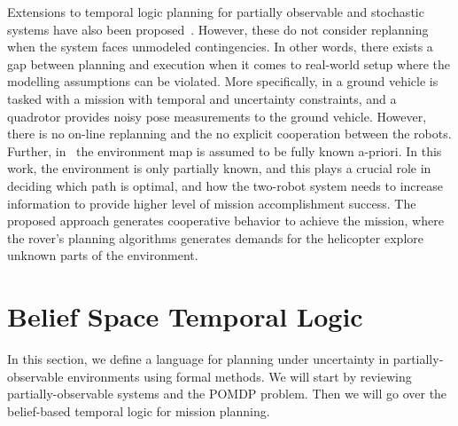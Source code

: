 \documentclass[letterpaper]{article} %
\newcommand{\cristi}[1]{{\color{orange} [Cristi] #1}}
\begin{document}
	
	
	
	
	Extensions to temporal logic planning for partially observable and stochastic systems have also been
	proposed~\cite{Cristi-CDC-2016,dorsa-rss2016,fu2015integrating}.
	However, these do not consider replanning when the system faces unmodeled contingencies.
	In other words, there exists a gap between planning and execution when it comes to real-world setup
	where the modelling assumptions can be violated.
	More specifically, in \cite{Cristi-CDC-2016} a ground vehicle is tasked with
	a mission with temporal and uncertainty constraints, and a quadrotor provides noisy pose measurements to the ground vehicle.
	However, there is no on-line replanning and the no explicit cooperation between the robots.
	Further, in~\cite{Cristi-CDC-2016} the environment map is assumed to be fully known a-priori.
	In this work, the environment is only partially known, and this plays a crucial role in
	deciding which path is optimal, and how the two-robot system needs to increase information to
	provide higher level of mission accomplishment success.
	The proposed approach generates cooperative behavior to achieve the mission, where the rover's planning
	algorithms generates demands for the helicopter explore unknown parts of the environment.

	
	\section{Belief Space Temporal Logic}
	\label{sec:POMDP}
	In this section, we define a language for planning under uncertainty in partially-observable environments using formal methods. We will start by reviewing partially-observable systems and the POMDP problem. Then we will go over the belief-based temporal logic for mission planning.
	
\end{document}
